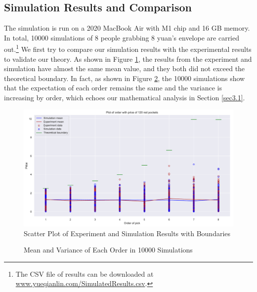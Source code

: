 \documentclass{scrartcl}
\begin{document}
\subsection{Simulation Results and Comparison}\label{sec4.2}
The simulation is run on a 2020 MacBook Air with M1 chip and 16 GB memory. In total, 10000 simulations of 8 people grabbing 8 yuan's envelope are carried out.\footnote{The  CSV file of results can be downloaded at \url{www.yueqianlin.com/SimulatedResults.csv}.} We first try to compare our simulation results with the experimental results to validate our theory. As shown in Figure \ref{sca}, the results from the experiment and simulation have almost the same mean value, and they both did not exceed the theoretical boundary. In fact, as shown in Figure \ref{mean_var_sim}, the 10000 simulations show that the expectation of each order remains the same and the variance is increasing by order, which echoes our mathematical analysis in Section \ref{sec3.1}.
\begin{figure}[H]
	\begin{center}
		\includegraphics[width=16cm]{pic1.pdf}
	\end{center}
	\caption{Scatter Plot of Experiment and Simulation Results with Boundaries}
	\label{sca}
\end{figure}
\begin{figure}[H]
\centering    
{}     
\caption{ Mean and Variance of Each Order in 10000 Simulations}     
\label{mean_var_sim} 
\end{figure}
\end{document}
